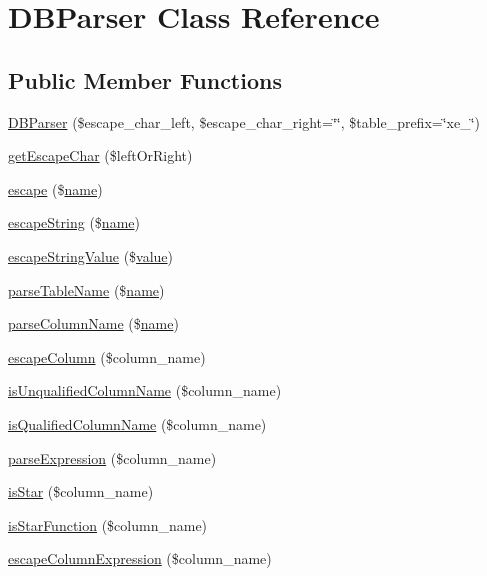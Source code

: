 \hypertarget{classDBParser}{}\section{D\+B\+Parser Class Reference}
\label{classDBParser}
\subsection*{Public Member Functions}
\begin{DoxyCompactItemize}
\item 
\hyperlink{classDBParser_a353eeb35ff30fb6de834a9341a143e31}{D\+B\+Parser} (\$escape\+\_\+char\+\_\+left, \$escape\+\_\+char\+\_\+right=\char`\"{}\char`\"{}, \$table\+\_\+prefix=\char`\"{}xe\+\_\+\char`\"{})
\item 
\hyperlink{classDBParser_aed9e06c08955d267a0576b178f37d6ee}{get\+Escape\+Char} (\$left\+Or\+Right)
\item 
\hyperlink{classDBParser_ac2807a8b1ef18ebf574078e60e1754c6}{escape} (\$\hyperlink{common_8js_a22c29d2aa8ed6161ce8faa718ef76e68}{name})
\item 
\hyperlink{classDBParser_acf60e21d6407197af743d97bc9158325}{escape\+String} (\$\hyperlink{common_8js_a22c29d2aa8ed6161ce8faa718ef76e68}{name})
\item 
\hyperlink{classDBParser_ac4a2f15f2cc6c4f0edf848cfc0005259}{escape\+String\+Value} (\$\hyperlink{common_2js_2jquery_8js_abe5393d870043cf6aaa1d5ad5fce755c}{value})
\item 
\hyperlink{classDBParser_ac4d949f99739a604bd7ee1ca7f14c946}{parse\+Table\+Name} (\$\hyperlink{common_8js_a22c29d2aa8ed6161ce8faa718ef76e68}{name})
\item 
\hyperlink{classDBParser_a4e9d7229c290a48fddd26c278f964dab}{parse\+Column\+Name} (\$\hyperlink{common_8js_a22c29d2aa8ed6161ce8faa718ef76e68}{name})
\item 
\hyperlink{classDBParser_a21799d785eb817b6df7871b895c91185}{escape\+Column} (\$column\+\_\+name)
\item 
\hyperlink{classDBParser_a049f95bd692b0d34a72f88f92091af6f}{is\+Unqualified\+Column\+Name} (\$column\+\_\+name)
\item 
\hyperlink{classDBParser_a927c668f7d1b2994743f9bdf6530ba58}{is\+Qualified\+Column\+Name} (\$column\+\_\+name)
\item 
\hyperlink{classDBParser_a44e806ac029512b9d54b2f44a0a6385f}{parse\+Expression} (\$column\+\_\+name)
\item 
\hyperlink{classDBParser_a73f99ee88bbe7c6bc871a67de4efa2b1}{is\+Star} (\$column\+\_\+name)
\item 
\hyperlink{classDBParser_a6a13c1cc9497af7dd0cb48e07b852947}{is\+Star\+Function} (\$column\+\_\+name)
\item 
\hyperlink{classDBParser_a98416a358e6b2647d03d967b28a11504}{escape\+Column\+Expression} (\$column\+\_\+name)
\end{DoxyCompactItemize}
